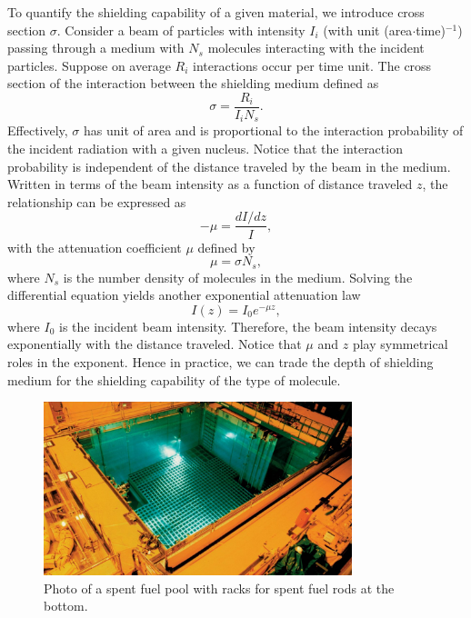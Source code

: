 \documentclass[nofootinbib,preprint,aps]{revtex4-1}
\begin{document}
    To quantify the shielding capability of a given material, we introduce cross section $\sigma$. Consider
    a beam of particles with intensity $I_i$ (with unit (area$\cdot$time)${}^{-1}$) passing through a medium
    with $N_s$ molecules interacting with the incident particles.
    Suppose on average $R_i$ interactions occur per time unit.
    The cross section of the interaction between the shielding medium defined as
    \begin{equation}
        \sigma = \frac{R_i}{I_i N_s}.
    \end{equation}
    Effectively, $\sigma$ has unit of area and
    is proportional to the interaction probability of the incident radiation with a given nucleus.\cite{k88}
    Notice that the interaction probability is independent of the distance traveled by the beam in
    the medium. Written in terms of the beam intensity as a function of distance traveled $z$,
    the relationship can be expressed as
    \begin{equation}
        -\mu = \frac{d I/dz}{I},
    \end{equation}
    with the attenuation coefficient $\mu$ defined by
    \begin{equation}
        \mu = \sigma N_s,
    \end{equation}
    where $N_s$ is the number density of molecules in the medium.
    Solving the differential
    equation yields another exponential attenuation law
    \begin{equation}
        \label{eq:atten}
        I(z) = I_0 e^{-\mu z},
    \end{equation}
    where $I_0$ is the incident beam intensity. Therefore, the beam intensity decays exponentially
    with the distance traveled. Notice that $\mu$ and $z$ play symmetrical roles in the exponent. Hence
    in practice, we can trade the depth of shielding medium for the shielding capability of the type of
    molecule.
        \begin{figure}
            \centering
            \includegraphics[width=0.8\textwidth]{pool.jpg}
            \caption{Photo of a spent fuel pool with racks for spent fuel rods at the bottom.\cite{s16}}
            \label{fig:pool}
        \end{figure}
\end{document}
